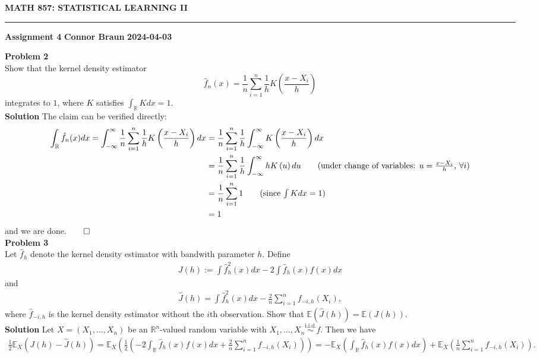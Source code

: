 \documentclass[10pt]{article}
\newcommand{\E}{\mathbb{E}}
\newcommand{\bp}[1]{\left({#1}\right)}
\newcommand{\mbb}[1]{\mathbb{#1}}
\newcommand{\1}[1]{\mathbbm{1}_{#1}}
\begin{document}
    \begin{center}
        {\bf\large{MATH 857: STATISTICAL LEARNING II}}
        \smallskip
        \hrule
        \smallskip
        {\bf Assignment 4} \hfill {\bf Connor Braun} \hfill {\bf 2024-04-03}
    \end{center}
    {\bf Problem 2}\\[5pt]
    Show that the kernel density estimator
    \[\hat{f}_n(x)=\frac{1}{n}\sum_{i=1}^n\frac{1}{h}K\bp{\frac{x-X_i}{h}}\]
    integrates to $1$, where $K$ satisfies $\int_{\mbb{R}} Kdx=1$.\\[5pt]
    {\bf Solution}\hspace{5pt} The claim can be verified directly:
    \begin{align*}
        \int_{\mbb{R}}\hat{f}_n(x)dx=\int_{-\infty}^\infty\frac{1}{n}\sum_{i=1}^n\frac{1}{h}K\bp{\frac{x-X_i}{h}}dx&=\frac{1}{n}\sum_{i=1}^n\frac{1}{h}\int_{-\infty}^\infty K\bp{\frac{x-X_i}{h}}dx\\
        &=\frac{1}{n}\sum_{i=1}^n\frac{1}{h}\int_{-\infty}^\infty hK\bp{u}du\tag{under change of variables: $u=\tfrac{x-X_i}{h}$, $\forall i$}\\
        &=\frac{1}{n}\sum_{i=1}^n1\tag{since $\int Kdx=1$}\\
        &=1
    \end{align*}
    and we are done.\hfill{$\qed$}\\[5pt]
    {\bf Problem 3}\\[5pt]
    Let $\hat{f}_h$ denote the kernel density estimator with bandwith parameter $h$. Define
    \begin{align*}
        J(h):=\int\hat{f}_h^2(x)dx-2\int\hat{f}_h(x)f(x)dx
    \end{align*}
    and
    \begin{align*}
        \hat{J}(h)=\int\hat{f}^2_h(x)dx-\frac{2}{n}\sum_{i=1}^nf_{-i,h}(X_i),
    \end{align*}
    where $\hat{f}_{-i,h}$ is the kernel density estimator without the $i$th observation. Show that $\E(\hat{J}(h))=\E(J(h))$.\\[5pt]
    {\bf Solution}\hspace{5pt} Let $X=(X_1,\dots,X_n)$ be an $\mbb{R}^n$-valued random variable with $X_1,\dots,X_n\overset{\text{i.i.d.}}{\sim}f$. Then we have
    \begin{align*}
        \frac{1}{2}\E_X\bp{J(h)-\hat{J}(h)}=\E_X\bp{\frac{1}{2}\bp{-2\int_\mbb{R}\hat{f}_h(x)f(x)dx+\frac{2}{n}\sum_{i=1}^nf_{-i,h}(X_i)}}=-\E_X\bp{\int_\mbb{R}\hat{f}_h(x)f(x)dx}+\E_X\bp{\frac{1}{n}\sum_{i=1}^nf_{-i,h}(X_i)}.\tag{1}
    \end{align*}
\end{document}
